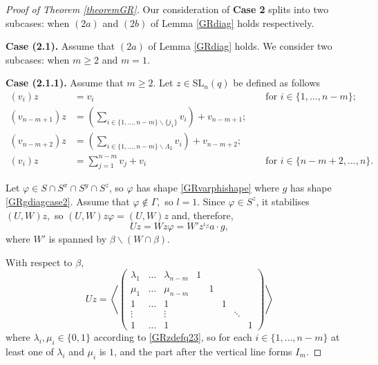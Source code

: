 \documentclass[a4paper,reqno,11pt]{amsart}
\theoremstyle{definition}
\theoremstyle{remark}
\numberwithin{equation}{section}
\newcommand{\SL}{{\mathrm{SL}}}
\begin{document}
\begin{proof}[Proof of Theorem {\rm \ref{theoremGR}}]
 Our consideration of {\bf Case 2} splits into two subcases: when $(2a)$ and $(2b)$ of Lemma \ref{GRdiag} holds respectively.

\medskip

{\bf Case (2.1).} Assume that $(2a)$ of Lemma \ref{GRdiag} holds. We consider two subcases: when $m \ge 2$ and $m=1$.

{\bf Case (2.1.1).} Assume that $m \ge 2.$ Let $z \in \SL_n(q)$ be defined as follows
\begin{equation}
\label{GRzdefq23}
\begin{aligned}
(v_i)z & =  v_i &&\text{ for } i \in \{1, \ldots, n-m\}; \\
(v_{n-m+1})z & =  \left(\underset{i \in \{1, \ldots, n-m\} \backslash \{j_1\}}{\sum} v_i \right) + v_{n-m+1};\\
(v_{n-m+2})z & =  \left(\underset{i \in \{1, \ldots, n-m\} \backslash \Lambda_2}{\sum} v_i \right)   + v_{n-m+2};\\
(v_i)z & =  \sum_{j=1}^{n-m} v_{j} + v_{i} && \text{ for } i \in \{n-m+2, \ldots, n\}.
\end{aligned} 
\end{equation}

Let $\varphi \in S \cap S^x \cap S^y \cap S^z$, so $\varphi$ has shape \eqref{GRvarphishape} where $g$ has shape \eqref{GRgdiagcase2}.   Assume that $\varphi \notin \Gamma,$ so $l=1.$ Since $\varphi \in S^z$, it stabilises $(U,W)z,$ so $(U,W)z \varphi =(U,W)z$ and, therefore, 
$$Uz=Wz \varphi = W'z^{\iota_{\beta}}a \cdot g,$$
where $W'$ is spanned by $\beta \backslash (W \cap \beta).$  

 With respect to $\beta$,
$$Uz= \left \langle 
\left(\begin{array}{ccc|ccccc}
\lambda_1 & \ldots & \lambda_{n-m}   &           1 & & & & \\
\mu_1     & \ldots & \mu_{n-m}       &           & 1 & & & \\
  1       & \ldots &  1              &           &   &1 & &  \\
\vdots    &        &\vdots           &           &  & &\ddots & \\
1         & \ldots &  1              &           &  & & & 1 
\end{array}\right)
\right \rangle$$
where $\lambda_i, \mu_i \in \{0,1\}$ according to \eqref{GRzdefq23}, so for each $i \in \{1, \ldots, n-m\}$ at least one of $\lambda_i$ and $\mu_i$ is $1$,  and the part after the vertical line forms $I_m.$


\end{proof}
\end{document}
